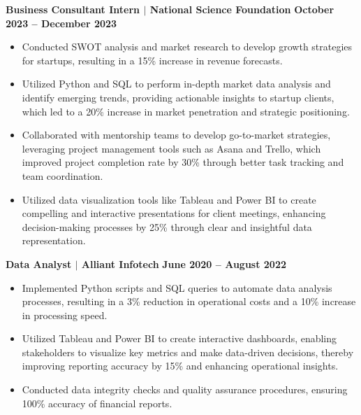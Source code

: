 \documentclass{article}
\begin{document}
\noindent \textbf{Business Consultant Intern $\mid$ National Science Foundation} \hfill \textbf{October 2023 – December 2023}
\begin{itemize}[noitemsep,nolistsep,leftmargin=*]
    \item {\small Conducted SWOT analysis and market research to develop growth strategies for startups, resulting in a 15\% increase in revenue forecasts.}
    \item {\small Utilized Python and SQL to perform in-depth market data analysis and identify emerging trends, providing actionable insights to startup clients, which led to a 20\% increase in market penetration and strategic positioning.}
   \item {\small Collaborated with mentorship teams to develop go-to-market strategies, leveraging project management tools such as Asana and Trello, which improved project completion rate by 30\% through better task tracking and team coordination.}
    \item {\small Utilized data visualization tools like Tableau and Power BI to create compelling and interactive presentations for client meetings, enhancing decision-making processes by 25\% through clear and insightful data representation.}
\end{itemize}
\vspace{1mm}

\noindent \textbf{Data Analyst $\mid$ Alliant Infotech} \hfill \textbf{June 2020 – August 2022}
\begin{itemize}[noitemsep,nolistsep,leftmargin=*]
    \item {\small Implemented Python scripts and SQL queries to automate data analysis processes, resulting in a 3\% reduction in operational costs and a 10\% increase in processing speed.}
   \item {\small Utilized Tableau and Power BI to create interactive dashboards, enabling stakeholders to visualize key metrics and make data-driven decisions, thereby improving reporting accuracy by 15\% and enhancing operational insights.}
    \item {\small Conducted data integrity checks and quality assurance procedures, ensuring 100\% accuracy of financial reports.}
\end{itemize}
\vspace{1mm}
\end{document}
